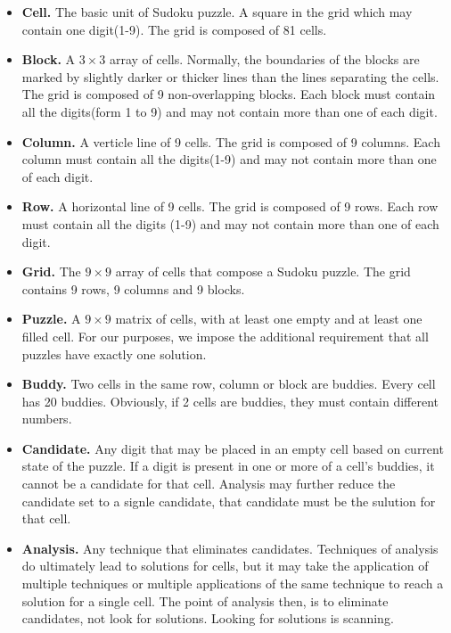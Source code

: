 \documentclass{mcmthesis}
\begin{document}
\begin{itemize}
	\item \textbf{Cell.} The basic unit of Sudoku puzzle. A square in the grid which may contain one digit(1-9). The grid is composed of 81 cells.

	\item \textbf{Block.} A $3\times3$ array of cells. Normally, the boundaries of the blocks are marked by slightly darker or thicker lines than the lines separating the cells. The grid is composed of 9 non-overlapping blocks. Each block must contain all the digits(form 1 to 9) and may not contain more than one of each digit.

	\item \textbf{Column.} A verticle line of 9 cells. The grid is composed of 9 columns. Each column must contain all the digits(1-9) and may not contain more than one of each digit.

	\item \textbf{Row.} A horizontal line of 9 cells. The grid is composed of 9 rows. Each row must contain all the digits (1-9) and may not contain more than one of each digit.

	\item \textbf{Grid.} The $9\times9$ array of cells that compose a Sudoku puzzle. The grid contains 9 rows, 9 columns and 9 blocks.

	\item \textbf{Puzzle.} A $9\times9$ matrix of cells, with at least one empty and at least one filled cell. For our purposes, we impose the additional requirement that all puzzles have exactly one solution. 	

	\item \textbf{Buddy.} Two cells in the same row, column or block are buddies. Every cell has 20 buddies. Obviously, if 2 cells are buddies, they must contain different numbers.

	\item \textbf{Candidate.} Any digit that may be placed in an empty cell based on current state of the puzzle. If a digit is present in one or more of a cell's buddies, it cannot be a candidate for that cell. Analysis may further reduce the candidate set to a signle candidate, that candidate must be the sulution for that cell.

	\item \textbf{Analysis.} Any technique that eliminates candidates. Techniques of analysis do ultimately lead to solutions for cells, but it may take the application of multiple techniques or multiple applications of the same technique to reach a solution for a single cell. The point of analysis then, is to eliminate candidates, not look for solutions. Looking for solutions is scanning.
\end{itemize}
\end{document}
